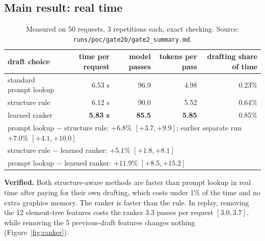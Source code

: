 \documentclass[10pt,a4paper]{article}
\begin{document}
\subsection{Main result: real time}
\begin{table}[H]\centering\small
\caption{Measured on 50 requests, 3 repetitions each, exact checking. Source: \texttt{runs/poc/gate2b/gate2\_summary.md}.}\label{tab:gpu}
\begin{tabular}{lrrrr}
\toprule
draft choice & time per request & model passes & tokens per pass & drafting share of time\\
\midrule
standard prompt lookup & 6.53 s & 96.9 & 4.98 & 0.23\%\\
structure rule & 6.12 s & 90.0 & 5.52 & 0.64\%\\
learned ranker & \textbf{5.83 s} & \textbf{85.5} & \textbf{5.85} & 0.85\%\\
\midrule
\multicolumn{5}{l}{prompt lookup $-$ structure rule: $+6.8\%$ $[+3.7, +9.9]$; earlier separate run $+7.0\%$ $[+4.1, +10.0]$}\\
\multicolumn{5}{l}{structure rule $-$ learned ranker: $+5.1\%$ $[+1.8, +8.1]$}\\
\multicolumn{5}{l}{prompt lookup $-$ learned ranker: $+11.9\%$ $[+8.5, +15.2]$}\\
\bottomrule
\end{tabular}
\end{table}
\textbf{Verified.} Both structure-aware methods are faster than prompt lookup in real time after paying for their own drafting, which costs under 1\% of the time and no extra graphics memory. The ranker is faster than the rule. In replay, removing the 12 element-tree features costs the ranker 3.3 passes per request $[3.0, 3.7]$, while removing the 5 previous-draft features changes nothing (Figure~\ref{fig:ranker}).
\end{document}
